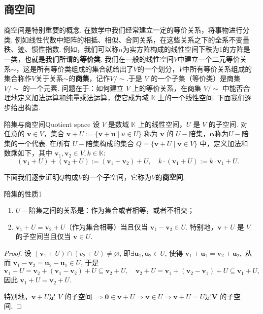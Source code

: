 \documentclass[12pt, a4paper,newtx]{ctexart}
\begin{document}
\subsection{商空间}
商空间是特别重要的概念. 在数学中我们经常建立一定的等价关系，将事物进行分类. 例如线性代数中矩阵的相抵、相似、合同关系，在这些关系之下的全系不变量秩、迹、惯性指数. 例如，我们可以称$n$为实方阵构成的线性空间下秩为1的方阵是一类，也就是我们所谓的\textbf{等价类}. 我们在一般的线性空间$V$中建立一个二元等价关系$\sim$，这是所有等价类组成的集合就给出了$V$的一个划分，$V$中所有等价关系组成的集合称作$V$关于关系$\sim$的\textbf{商集}，记作$V/\sim. $于是 $V$ 的一个子集（等价类）是商集 $V/\sim$ 的一个元素. 问题在于：如何建立 $V$ 上的等价关系，在商集 $V/\sim$ 中能否合理地定义加法运算和纯量乘法运算，使它成为域 $\mathbb K$ 上的一个线性空间. 下面我们逐步给出构造. 
\begin{definition}{陪集与商空间}{Quotient space}\kaishu 
	设 $V$ 是数域 $\mathbb K$ 上的线性空间，$U$ 是 $V$ 的子空间. 对任意的 $\bm v \in V$，集合 $\bm v + U := \{\bm v +\bm u \mid u \in U\}$ 称为 $\bm v$ 的 $U-${\heiti 陪集}，$\bm\alpha$称为$U-$陪集的一个代表. 在所有 $U-$陪集构成的集合 $Q = \{\bm v + U \mid \bm v \in V\}$ 中，定义加法和数乘如下，其中 $\bm v_1, \bm v_2 \in V, k \in \mathbb K$:\[(\bm v_1 + U) + (\bm v_2 + U) := (\bm v_1 + \bm v_2) + U, \quad k \cdot (\bm v_1 + U) := k \cdot\bm v_1 + U.\]
\end{definition}
下面我们逐步证明$Q$构成$V$的一个子空间，它称为$V$的\textbf{商空间}. 
\begin{proposition}{陪集的性质1}{}
	\begin{enumerate}
		\item $U-$陪集之间的关系是：作为集合或者相等，或者不相交；
		\item $\bm v_1 + U =\bm v_2 + U$（作为集合相等）当且仅当 $\bm v_1 - \bm v_2 \in U$. 特别地，$\bm v + U$ 是 $V$ 的子空间当且仅当 $\bm v \in U$. 
	\end{enumerate}
\end{proposition}
\begin{proof}
	设 $(\bm v_1 + U) \cap (v_2 + U) \neq\varnothing$, 即$\exists \bm u_1, \bm u_2 \in U$, 使得 $\bm v_1 + \bm u_1 = \bm v_2 + \bm u_2,$
	从而 $\bm v_1 -\bm v_2 = \bm u_2 -\bm u_1 \in U$, 于是
	\[
	\bm v_1 + U = \bm v_2 + (\bm v_1 -\bm v_2) + U \subseteq \bm v_2 + U, \quad \bm v_2 + U =\bm v_1 + (\bm v_2 -\bm v_1) + U \subseteq \bm v_1 + U,
	\]
	因此 $\bm v_1 + U = \bm v_2 + U$.
	
	特别地，$\bm v + U$是 $V$ 的子空间 $\Longrightarrow \bm 0 \in \bm v + U \Longrightarrow\bm v \in U \Longrightarrow\bm v + U = U$是$\bm V$ 的子空间.
\end{proof}
\end{document}
